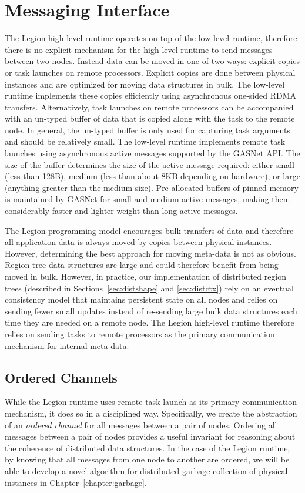 \section{Messaging Interface}
\label{sec:messaging}
The Legion high-level runtime operates on top of
the low-level runtime, therefore there is no 
explicit mechanism for the high-level runtime to 
send messages between two nodes.  Instead data 
can be moved in one of two ways: explicit copies 
or task launches on remote processors. Explicit copies 
are done  between physical instances and are optimized 
for moving data structures in bulk. The low-level 
runtime implements these copies efficiently using
asynchronous one-sided RDMA transfers. Alternatively,
task launches on remote processors can be 
accompanied with an un-typed buffer of data that 
is copied along with the task to the remote node.  
In general, the un-typed buffer is only used for 
capturing task arguments and should be relatively 
small. The low-level runtime implements remote
task launches using asynchronous active messages
supported by the GASNet API\cite{GASNet02}. The 
size of the buffer determines the size of the active
message required: either small (less than 128B), 
medium (less than about 8KB depending on hardware),
or large (anything greater than the medium size).
Pre-allocated buffers of pinned memory is maintained
by GASNet for small and medium active messages, making 
them considerably faster and lighter-weight than long 
active messages.

The Legion programming model encourages bulk transfers
of data and therefore all application data is always
moved by copies between physical instances. However,
determining the best approach for moving meta-data
is not as obvious. Region tree data structures are
large and could therefore benefit from being moved
in bulk.  However, in practice, our implementation
of distributed region trees (described in 
Sections~\ref{sec:distshape} and \ref{sec:distctx})
rely on an eventual consistency model that 
maintains persistent state on all nodes and relies
on sending fewer small updates instead of 
re-sending large bulk data structures each time
they are needed on a remote node. The Legion high-level
runtime therefore relies on sending tasks to remote 
processors as the primary communication mechanism 
for internal meta-data.

\subsection{Ordered Channels}
\label{subsec:channels}
While the Legion runtime uses remote task launch
as its primary communication mechanism, it does
so in a disciplined way.  Specifically, we create
the abstraction of an {\em ordered channel} for all
messages between a pair of nodes.  Ordering all
messages between a pair of nodes provides a useful
invariant for reasoning about the coherence of distributed
data structures.  In the case of the Legion runtime,
by knowing that all messages from one node to another 
are ordered, we will be able to develop a novel algorithm
for distributed garbage collection of physical instances
in Chapter~\ref{chapter:garbage}.

